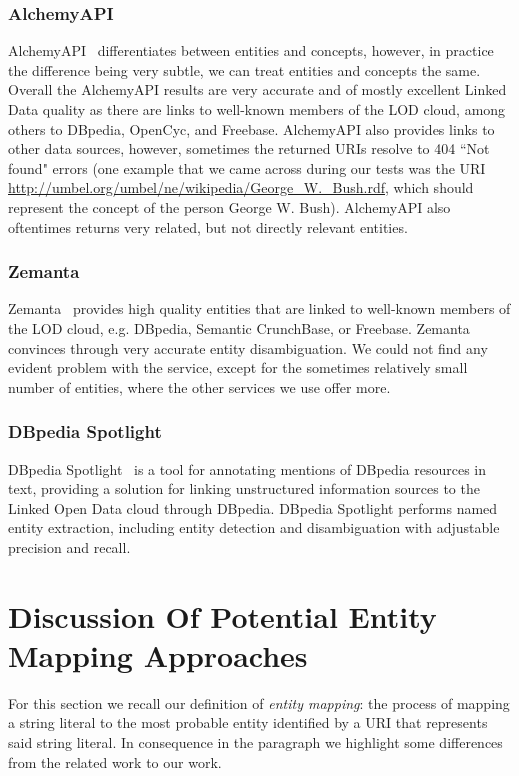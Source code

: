 \documentclass[twocolumn]{article}
\begin{document}
\subsubsection{AlchemyAPI}
AlchemyAPI~\cite{AlchemyAPI} differentiates between entities and concepts, however, in practice the difference being very subtle, we can treat entities and concepts the same. Overall the AlchemyAPI results are very accurate and of mostly excellent Linked Data quality as there are links to well-known members of the LOD cloud, among others to DBpedia, OpenCyc, and Freebase. AlchemyAPI also provides links to other data sources, however, sometimes the returned URIs resolve to 404 ``Not found" errors (one example that we came across during our tests was the URI \url{http://umbel.org/umbel/ne/wikipedia/George_W._Bush.rdf}, which should represent the concept of the person George W. Bush). AlchemyAPI also oftentimes returns very related, but not directly relevant entities.

\subsubsection{Zemanta}
Zemanta~\cite{Zemanta} provides high quality entities that are linked to well-known members of the LOD cloud, e.g. DBpedia, Semantic CrunchBase, or Freebase. Zemanta convinces through very accurate entity disambiguation. We could not find any evident problem with the service, except for the sometimes relatively small number of entities, where the other services we use offer more.

\subsubsection{DBpedia Spotlight}
DBpedia Spotlight~\cite{spotlight} is a tool for annotating mentions of DBpedia resources in text, providing a solution for linking unstructured information sources to the Linked Open Data cloud through DBpedia. DBpedia Spotlight performs named entity extraction, including entity detection and disambiguation with adjustable precision and recall.

\section{Discussion Of Potential Entity Mapping Approaches}\label{sec:discussion}

For this section we recall our definition of \textit{entity mapping}: the process of mapping a string literal to the
most probable entity identified by a URI that represents said string literal. In consequence in the paragraph we
highlight some differences from the related work to our work.
\end{document}
